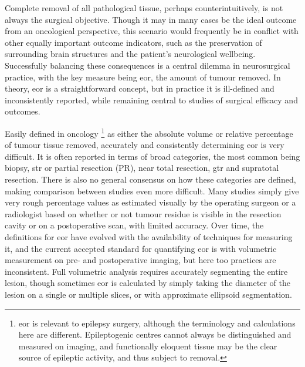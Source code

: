 Complete removal of all pathological tissue, perhaps counterintuitively, is not always the surgical objective.
Though it may in many cases be the ideal outcome from an oncological perspective, this scenario would frequently be in conflict with other equally important outcome indicators, such as the preservation of surrounding brain structures and the patient's neurological wellbeing.
Successfully balancing these consequences is a central dilemma in neurosurgical practice, with the key measure being \gls{eor}, the amount of tumour removed.
In theory, \gls{eor} is a straightforward concept, but in practice it is ill-defined and inconsistently reported, while remaining central to studies of surgical efficacy and outcomes.

Easily defined in oncology%
\footnote[2]{\gls{eor} is relevant to epilepsy surgery, although the terminology and calculations here are different. Epileptogenic centres cannot always be distinguished and measured on imaging, and functionally eloquent tissue may be the clear source of epileptic activity, and thus subject to removal.}
as either the absolute volume or relative percentage of tumour tissue removed, accurately and consistently determining \gls{eor} is very difficult.
It is often reported in terms of broad categories, the most common being biopsy, \gls{str} or partial resection (PR), near total resection, \gls{gtr} and supratotal resection\autocite{Wykes2021,Karschnia2021}.
There is also no general consensus on how these categories are defined, making comparison between studies even more difficult\autocite{Karschnia2021}.
Many studies simply give very rough percentage values as estimated visually by the operating surgeon or a radiologist based on whether or not tumour residue is visible in the resection cavity or on a postoperative scan, with limited accuracy\autocite{Sanai2008,Martino2013,Lau2018,Sezer2020}.
Over time, the definitions for \gls{eor} have evolved with the availability of techniques for measuring it, and the current accepted standard for quantifying \gls{eor} is with volumetric measurement on pre- and postoperative imaging\autocite{Rincon-Torroella2019}, but here too practices are inconsistent\autocite{Wykes2021}.
Full volumetric analysis requires accurately segmenting the entire lesion, though sometimes \gls{eor} is calculated by simply taking the diameter of the lesion on a single or multiple slices, or with approximate ellipsoid segmentation\autocite{Sanai2008,Albuquerque2021}.

